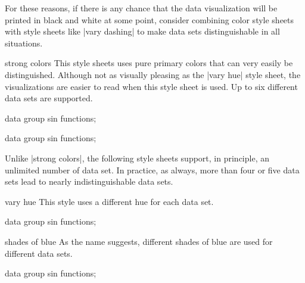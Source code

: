 For these reasons, if there is any chance that the data visualization will be
printed in black and white at some point, consider combining color style sheets
with style sheets like |vary dashing| to make data sets distinguishable in all
situations.

\begin{stylesheet}{strong colors}
    This style sheets uses pure primary colors that can very easily be
    distinguished. Although not as visually pleasing as the |vary hue| style
    sheet, the visualizations are easier to read when this style sheet is used.
    Up to six different data sets are supported.
\begin{codeexample}[width=10cm]
\tikz \datavisualization [
  visualize as smooth line/.list=
    {1,2,3,4,5,6,7,8},
  example visualization,
  style sheet=strong colors]
data group {sin functions};
\end{codeexample}
\begin{codeexample}[width=10cm]
\tikz \datavisualization [
  visualize as smooth line/.list=
    {1,2,3,4,5,6,7,8},
  example visualization,
  style sheet=strong colors,
  style sheet=vary dashing]
data group {sin functions};
\end{codeexample}
\end{stylesheet}


Unlike |strong colors|, the following style sheets support, in principle, an
unlimited number of data set. In practice, as always, more than four or five
data sets lead to nearly indistinguishable data sets.

\begin{stylesheet}{vary hue}
    This style uses a different hue for each data set.
\begin{codeexample}[width=10cm]
\tikz \datavisualization [
  visualize as smooth line/.list=
    {1,2,3,4,5,6,7,8},
  example visualization,
  style sheet=vary hue]
data group {sin functions};
\end{codeexample}
\end{stylesheet}

\begin{stylesheet}{shades of blue}
    As the name suggests, different shades of blue are used for different data
    sets.
\begin{codeexample}[width=10cm]
\tikz \datavisualization [
  visualize as smooth line/.list=
    {1,2,3,4,5,6,7,8},
  example visualization,
  style sheet=shades of blue]
data group {sin functions};
\end{codeexample}
\end{stylesheet}

